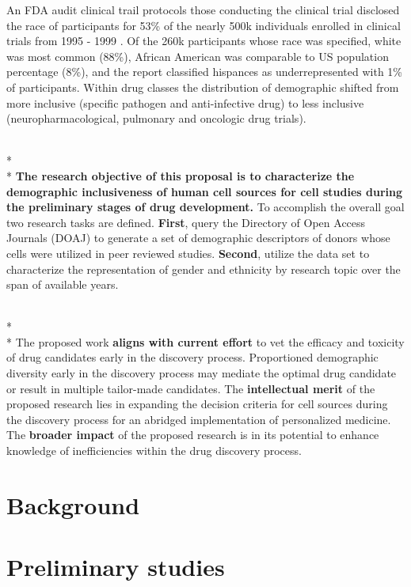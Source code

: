 \documentclass[10pt]{article}
\begin{document}
An FDA audit clinical trail protocols those conducting the clinical trial disclosed the race of participants for 53\% of the nearly 500k individuals enrolled in clinical trials from 1995 - 1999  \cite{evelyn2001participation}.  Of the 260k participants whose race was specified, white was most common (88\%), African American was comparable to US population percentage (8\%), and the report classified hispances as underrepresented with 1\% of participants.  Within drug classes the distribution of demographic shifted from more inclusive (specific pathogen and anti-infective drug) to less inclusive (neuropharmacological, pulmonary and oncologic drug trials).  


\\* \\*  \textbf{The research objective of this proposal is to characterize the demographic inclusiveness of human cell sources for cell studies during the preliminary stages of drug development.}  To accomplish the overall goal two research tasks are defined. 
\textbf{First}, query the Directory of Open Access Journals (DOAJ) to generate a set of demographic descriptors of donors whose cells were utilized in peer reviewed studies. \textbf{Second}, utilize the data set to characterize the representation of gender and ethnicity by research topic over the span of available years. 

\\* \\* The proposed work \textbf{aligns with current effort} to vet the efficacy and toxicity of drug candidates early in the discovery process. Proportioned demographic diversity early in the discovery process may mediate the optimal drug candidate or result in multiple tailor-made candidates. The \textbf{intellectual merit} of the proposed research lies in expanding the decision criteria for cell sources during the discovery process for an abridged implementation of personalized medicine. The \textbf{broader impact} of the proposed research is in its potential to enhance knowledge of inefficiencies within the drug discovery process. 

\section{Background}

\section{Preliminary studies}
\end{document}
